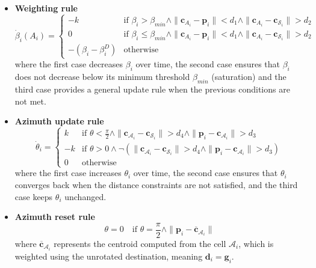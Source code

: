         \begin{itemize}
            \item \textbf{Weighting rule}
                \begin{equation}
                    \label{eqn:beta_weighting}
                    \dot{\beta}_i(A_i) = 
                    \begin{cases}
                        -k & \text{if } \beta_i > \beta_{min} \land \|\mathbf{c}_{A_i} - \mathbf{p}_i\| < d_1 \land \|\mathbf{c}_{A_i} - \mathbf{c}_{\mathcal{S}_i}\| > d_2  \\
                        0  & \text{if } \beta_i \leq \beta_{min} \land \|\mathbf{c}_{A_i} - \mathbf{p}_i\| < d_1 \land \|\mathbf{c}_{A_i} - \mathbf{c}_{\mathcal{S}_i}\| > d_2  \\
                        -(\beta_i - \beta_i^D) & \text{otherwise}
                    \end{cases}
                \end{equation}
                where the first case decreases $\beta_i$ over time, the second case ensures that $\beta_i$ does not decrease below its minimum threshold $\beta_{min}$ (saturation) and the third case provides a general update rule when the previous conditions are not met.
            \item \textbf{Azimuth update rule}
                \begin{equation}
                    \label{eqn:azimuth_2d}
                    \dot{\theta}_i = 
                    \begin{cases}
                        k  & \text{if } \theta < \frac{\pi}{2} \land \|\mathbf{c}_{\mathcal{A}_i} - \mathbf{c}_{\mathcal{S}_i}\| > d_4 \land \|\mathbf{p}_i - \mathbf{c}_{\mathcal{A}_i}\| > d_3 \\
                        -k & \text{if } \theta > 0 \land \neg (\|\mathbf{c}_{\mathcal{A}_i} - \mathbf{c}_{\mathcal{S}_i}\| > d_4 \land \|\mathbf{p}_i - \mathbf{c}_{\mathcal{A}_i}\| > d_3) \\
                        0  & \text{otherwise}
                    \end{cases}
                \end{equation}
                where the first case increases $\theta_i$ over time, the second case ensures that $\theta_i$ converges back when the distance constraints are not satisfied, and the third case keeps $\theta_i$ unchanged.
            \item \textbf{Azimuth reset rule}
                \begin{equation}
                    \label{eqn:azimuth_reset_2d}
                    \theta = 0 \quad \text{if } \theta = \frac{\pi}{2} \land \| \mathbf{p}_i - \mathbf{\overline{c}}_{\mathcal{A}_i} \|    
                \end{equation}
                where $\mathbf{\overline{c}}_{\mathcal{A}_i}$ represents the centroid computed from the cell $\mathcal{A}_i$, which is weighted using the unrotated destination, meaning $\mathbf{d}_i = \mathbf{g}_i$.
        \end{itemize}
